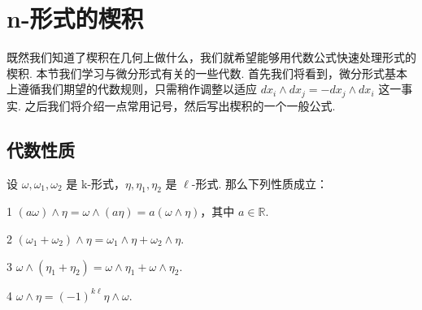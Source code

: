 \section{n-形式的楔积}

既然我们知道了楔积在几何上做什么，我们就希望能够用代数公式快速处理形式的楔积. 本节我们学习与微分形式有关的一些代数. 首先我们将看到，微分形式基本上遵循我们期望的代数规则，只需稍作调整以适应 $dx_i\wedge dx_j=-dx_j\wedge dx_i$ 这一事实. 之后我们将介绍一点常用记号，然后写出楔积的一个一般公式.

\subsection{代数性质}

设 $\omega,\omega_1,\omega_2$ 是 k-形式，$\eta,\eta_1,\eta_2$ 是 $\ell$-形式. 那么下列性质成立：

\begin{property}{1}\label{prop:3-1}
$(a\omega)\wedge\eta=\omega\wedge(a\eta)=a(\omega\wedge\eta)$，其中 $a\in\mathbb{R}$.
\end{property}

\begin{property}{2}\label{prop:3-2}
$(\omega_1+\omega_2)\wedge\eta=\omega_1\wedge\eta+\omega_2\wedge\eta$.
\end{property}

\begin{property}{3}\label{prop:3-3}
$\omega\wedge(\eta_1+\eta_2)=\omega\wedge\eta_1+\omega\wedge\eta_2$.
\end{property}

\begin{property}{4}\label{prop:3-4}
$\omega\wedge\eta=(-1)^{k\ell}\eta\wedge\omega$.
\end{property}

